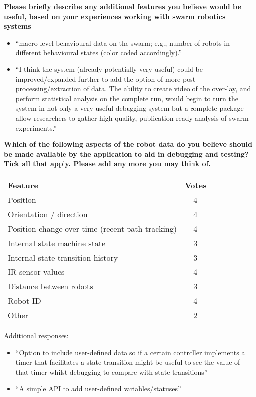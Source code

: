 \vspace{1cm}

\textbf{Please briefly describe any additional features you believe would be useful, based on your experiences working with swarm robotics systems}

\begin{itemize}
\item ``macro-level behavioural data on the swarm; e.g., number of robots in different behavioural states (color coded accordingly).''
\item ``I think the system (already potentially very useful) could be improved/expanded further to add the option of more post-processing/extraction of data. The ability to create video of the over-lay, and perform statistical analysis on the complete run, would begin to turn the system in not only a very useful debugging system but a complete package allow researchers to gather high-quality, publication ready analysis of swarm experiments.''
\end{itemize}

\vspace{2cm}

\textbf{Which of the following aspects of the robot data do you believe should be made available by the application to aid in debugging and testing? Tick all that apply. Please add any more you may think of.}

\begin{center}
\begin{tabular}{ p{10cm} c }
 Feature & Votes\\ 
 \hline
 Position & 4\\
 Orientation / direction & 4\\
 Position change over time (recent path tracking) & 4\\
 Internal state machine state & 3\\
 Internal state transition history & 3\\
 IR sensor values & 4\\
 Distance between robots & 3\\
 Robot ID & 4\\
 Other & 2\\
\end{tabular}
\end{center}

Additional responses:

\begin{itemize}
\item ``Option to include user-defined data so if a certain controller implements a timer that facilitates a state transition might be useful to see the value of that timer whilst debugging to compare with state transitions''
\item ``A simple API to add user-defined variables/statuses''
\end{itemize}

